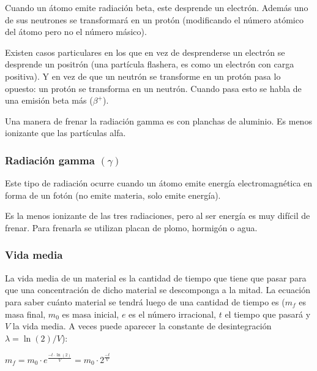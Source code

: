 Cuando un átomo emite radiación beta, este desprende un electrón. Además uno de sus neutrones se transformará en un protón (modificando el número atómico del átomo pero no el número másico). 

\vspace{0.2cm}
Existen casos particulares en los que en vez de desprenderse un electrón se desprende un positrón (una partícula flashera, es como un electrón con carga positiva). Y en vez de que un neutrón se transforme en un protón pasa lo opuesto: un protón se transforma en un neutrón. Cuando pasa esto se habla de una emisión beta más ($\beta^+$).

\vspace{0.2cm}
Una manera de frenar la radiación gamma es con planchas de aluminio. Es menos ionizante que las partículas alfa.

\subsubsection*{Radiación gamma $(\gamma)$}

Este tipo de radiación ocurre cuando un átomo emite energía electromagnética en forma de un fotón (no emite materia, solo emite energía).

Es la menos ionizante de las tres radiaciones, pero al ser energía es muy difícil de frenar. Para frenarla se utilizan placan de plomo, hormigón o agua.

\subsubsection*{Vida media}

La vida media de un material es la cantidad de tiempo que tiene que pasar para que una concentración de dicho material se descomponga a la mitad. La ecuación para saber cuánto material se tendrá luego de una cantidad de tiempo es ($m_f$ es masa final, $m_0$ es masa inicial, $e$ es el número irracional, $t$ el tiempo que pasará y $V$ la vida media. A veces puede aparecer la constante de desintegración $\lambda=\ln(2)/V$):

\vspace{3mm}
\hfil{\LARGE
$m_f = m_0 \cdot e^{\frac{-t\cdot \ln(2)}{V}}=
m_0 \cdot 2^{\frac{-t}{V}}$\hfil
}
